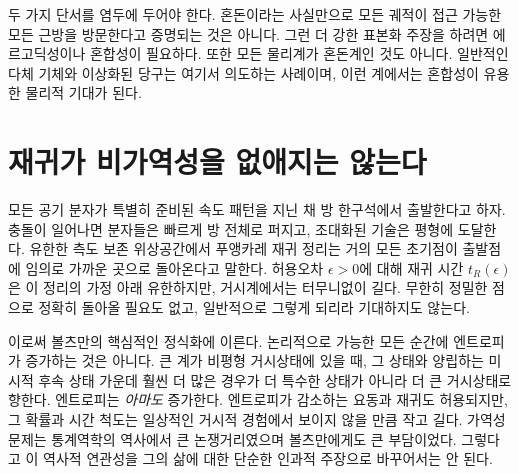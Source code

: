 두 가지 단서를 염두에 두어야 한다. 혼돈이라는 사실만으로 모든 궤적이 접근 가능한 모든 근방을 방문한다고 증명되는 것은 아니다. 그런 더 강한 표본화 주장을 하려면 에르고딕성이나 혼합성이 필요하다. 또한 모든 물리계가 혼돈계인 것도 아니다. 일반적인 다체 기체와 이상화된 당구는 여기서 의도하는 사례이며, 이런 계에서는 혼합성이 유용한 물리적 기대가 된다.

\section{재귀가 비가역성을 없애지는 않는다}

모든 공기 분자가 특별히 준비된 속도 패턴을 지닌 채 방 한구석에서 출발한다고 하자. 충돌이 일어나면 분자들은 빠르게 방 전체로 퍼지고, 조대화된 기술은 평형에 도달한다. 유한한 측도 보존 위상공간에서 푸앵카레 재귀 정리는 거의 모든 초기점이 출발점에 임의로 가까운 곳으로 돌아온다고 말한다. 허용오차 \(\epsilon>0\)에 대해 재귀 시간 \(t_R(\epsilon)\)은 이 정리의 가정 아래 유한하지만, 거시계에서는 터무니없이 길다. 무한히 정밀한 점으로 정확히 돌아올 필요도 없고, 일반적으로 그렇게 되리라 기대하지도 않는다.

\begin{classroomqa}
\end{classroomqa}

\begin{classroomqa}
\end{classroomqa}

이로써 볼츠만의 핵심적인 정식화에 이른다. 논리적으로 가능한 모든 순간에 엔트로피가 증가하는 것은 아니다. 큰 계가 비평형 거시상태에 있을 때, 그 상태와 양립하는 미시적 후속 상태 가운데 훨씬 더 많은 경우가 더 특수한 상태가 아니라 더 큰 거시상태로 향한다. 엔트로피는 \emph{아마도} 증가한다. 엔트로피가 감소하는 요동과 재귀도 허용되지만, 그 확률과 시간 척도는 일상적인 거시적 경험에서 보이지 않을 만큼 작고 길다. 가역성 문제는 통계역학의 역사에서 큰 논쟁거리였으며 볼츠만에게도 큰 부담이었다. 그렇다고 이 역사적 연관성을 그의 삶에 대한 단순한 인과적 주장으로 바꾸어서는 안 된다.

